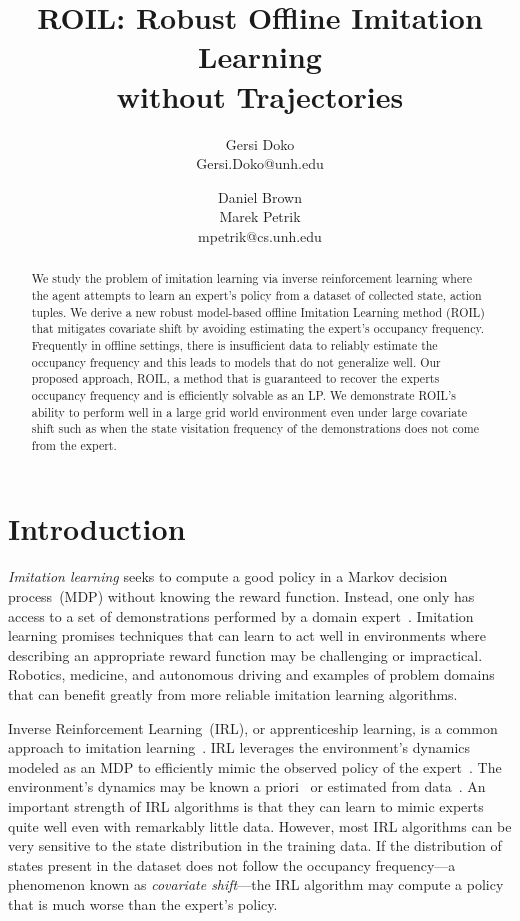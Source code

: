 \documentclass[10pt]{article}
\title{ROIL: Robust Offline Imitation Learning\\
  without Trajectories}
\author{Gersi Doko \\
        Gersi.Doko@unh.edu \\
        \and 
        Daniel Brown \\
        Marek Petrik \\
        mpetrik@cs.unh.edu 
      }
\renewcommand{\cite}{\citep}
\theoremstyle{plain}
\theoremstyle{remark}
\begin{document}
\maketitle

\begin{abstract}
We study the problem of imitation learning via inverse reinforcement learning where the agent attempts to learn an expert's policy from a dataset of collected state, action tuples. We derive a new robust model-based offline Imitation Learning method (ROIL) that mitigates covariate shift by avoiding estimating the expert's occupancy frequency. Frequently in offline settings, there is insufficient data to reliably estimate the occupancy frequency and this leads to models that do not generalize well. Our proposed approach, ROIL, a method that is guaranteed to recover the experts occupancy frequency and is efficiently solvable as an LP. We demonstrate ROIL's ability to perform well in a large grid world environment even under large covariate shift such as when the state visitation frequency of the demonstrations does not come from the expert.
\end{abstract}

\section{Introduction}

\emph{Imitation learning} seeks to compute a good policy in a Markov decision process~(MDP) without knowing the reward function. Instead, one only has access to a set of demonstrations performed by a domain expert~\cite{chang2021mitigating, Panaganti2023, Spencer2021, Rashidinejad2022}. Imitation learning promises techniques that can learn to act well in environments where describing an appropriate reward function may be challenging or impractical. Robotics, medicine, and autonomous driving and examples of problem domains that can benefit greatly from more reliable imitation learning algorithms. 

Inverse Reinforcement Learning~(IRL), or apprenticeship learning, is a common approach to imitation learning~\cite{abbeel2004, ziebart2008maximum, Brown2018a, fu2018learning}. IRL leverages the environment's dynamics modeled as an MDP to efficiently mimic the observed policy of the expert~\cite{arora2021survey}. The environment's dynamics may be known a priori~\cite{Syed2008, lacotte2019} or estimated from data~\cite{Ho2016,chang2021mitigating}. An important strength of IRL algorithms is that they can learn to mimic experts quite well even with remarkably little data. However, most IRL algorithms can be very sensitive to the state distribution in the training data. If the distribution of states present in the dataset does not follow the occupancy frequency---a phenomenon known as \emph{covariate shift}---the IRL algorithm may compute a policy that is much worse than the expert's policy. 
\end{document}
